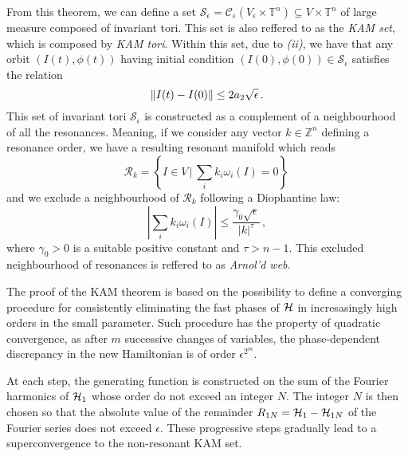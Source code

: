 From this theorem, we can define a set $\mathcal{S}_\epsilon = \mathcal{C}_\epsilon(V_\epsilon \times \mathbb{T}^n) \subseteq V \times \mathbb{T}^n$ of large measure composed of invariant tori. This set is also reffered to as the \textit{KAM set}, which is composed by \textit{KAM tori}. Within this set, due to \textit{(ii)}, we have that any orbit $(I(t), \phi(t))$ having initial condition $(I(0), \phi(0)) \in \mathcal{S}_\epsilon$ satisfies the relation
\begin{equation}
    \norm{I(t) - I(0)} \leq 2 a_2 \sqrt{\epsilon} \,.
\end{equation}
This set of invariant tori $\mathcal{S}_\epsilon$ is constructed as a complement of a neighbourhood of all the resonances. Meaning, if we consider any vector $k\in \mathbb{Z}^n$ defining a resonance order, we have a resulting resonant manifold which reads
\begin{equation}
    \mathcal{R}_k = \left\{I\in V \, \big| \, \sum_i k_i \omega_i(I) = 0\right\} \,
\end{equation}  
and we exclude a neighbourhood of $\mathcal{R}_k$ following a Diophantine law:
\begin{equation}
    \left|\sum_i k_i \omega_i(I)\right| \leq \frac{\gamma_0 \sqrt{\epsilon}}{|k|^\tau} \,,
    \label{eq:Diophantine-law}
\end{equation}
where $\gamma_0 > 0$ is a suitable positive constant and $\tau > n-1$. This excluded neighbourhood of resonances is reffered to as \textit{Arnol'd web}.

The proof of the KAM theorem is based on the possibility to define a converging procedure for consistently eliminating the fast phases of $\mathcal{H}$ in incresasingly high orders in the small parameter. Such procedure has the property of quadratic convergence, as after $m$ successive changes of variables, the phase-dependent discrepancy in the new Hamiltonian is of order $\epsilon^{2^m}$.

At each step, the generating function is constructed on the sum of the Fourier harmonics of $\mathcal{H}_1$ whose order do not exceed an integer $N$. The integer $N$ is then chosen so that the absolute value of the remainder $R_{1N} = \mathcal{H}_1 - \mathcal{H}_{1N}$ of the Fourier series does not exceed $\epsilon$. These progressive steps gradually lead to a superconvergence to the non-resonant KAM set.

